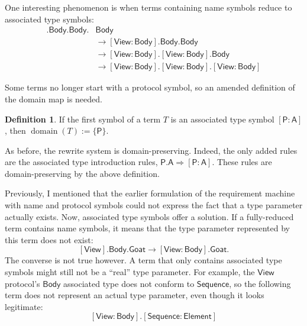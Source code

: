 \documentclass[headsepline,bibliography=totoc]{scrreport}
\newcommand{\namesym}[1]{\mathsf{#1}}
\newcommand{\proto}[1]{\bm{\mathsf{#1}}}
\newcommand{\protosym}[1]{[\proto{#1}]}
\newcommand{\assocsym}[2]{[\proto{#1}\colon\namesym{#2}]}
\DeclareMathOperator{\domain}{domain}
\theoremstyle{definition}
\theoremstyle{definition}
\newtheorem{definition}{Definition}[chapter]
\theoremstyle{definition}
\begin{document}
One interesting phenomenon is when terms containing name symbols reduce to associated type symbols:
\begin{align}
\protosym{View}.\namesym{Body}.\namesym{Body}.&\namesym{Body}\nonumber\\
&\rightarrow\assocsym{View}{Body}.\namesym{Body}.\namesym{Body}\tag{Rule 1}\\
&\rightarrow\assocsym{View}{Body}.\assocsym{View}{Body}.\namesym{Body}\tag{Rule 4}\\
&\rightarrow\assocsym{View}{Body}.\assocsym{View}{Body}.\assocsym{View}{Body}\tag{Rule 4}
\end{align}

Some terms no longer start with a protocol symbol, so an amended definition of the domain map is needed.
\begin{definition} If the first symbol of a term $T$ is an associated type symbol $\assocsym{P}{A}$, then $\domain(T):=\{\proto{P}\}$.
\end{definition}
As before, the rewrite system is domain-preserving. Indeed, the only added rules are the associated type introduction rules, $\proto{P}.\namesym{A}\Rightarrow\assocsym{P}{A}$. These rules are domain-preserving by the above definition.

Previously, I mentioned that the earlier formulation of the requirement machine with name and protocol symbols could not express the fact that a type parameter actually exists. Now, associated type symbols offer a solution. If a fully-reduced term contains name symbols, it means that the type parameter represented by this term does not exist:
\[\protosym{View}.\namesym{Body}.\namesym{Goat}\rightarrow\assocsym{View}{Body}.\namesym{Goat}.\]
The converse is not true however. A term that only contains associated type symbols might still not be a ``real'' type parameter. For example, the $\proto{View}$ protocol's $\namesym{Body}$ associated type does not conform to $\proto{Sequence}$, so the following term does not represent an actual type parameter, even though it looks legitimate:
\[\assocsym{View}{Body}.\assocsym{Sequence}{Element}\]
\end{document}
